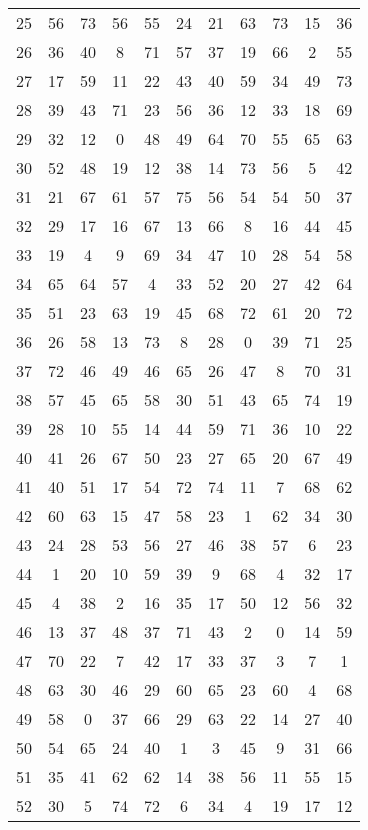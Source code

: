 \begin{table}
\begin{tabular}{c c c c c c c c c c c }
25 & 56 & 73 & 56 & 55 & 24 & 21 & 63 & 73 & 15 & 36 \\
26 & 36 & 40 & 8 & 71 & 57 & 37 & 19 & 66 & 2 & 55 \\
27 & 17 & 59 & 11 & 22 & 43 & 40 & 59 & 34 & 49 & 73 \\
28 & 39 & 43 & 71 & 23 & 56 & 36 & 12 & 33 & 18 & 69 \\
29 & 32 & 12 & 0 & 48 & 49 & 64 & 70 & 55 & 65 & 63 \\
30 & 52 & 48 & 19 & 12 & 38 & 14 & 73 & 56 & 5 & 42 \\
31 & 21 & 67 & 61 & 57 & 75 & 56 & 54 & 54 & 50 & 37 \\
32 & 29 & 17 & 16 & 67 & 13 & 66 & 8 & 16 & 44 & 45 \\
33 & 19 & 4 & 9 & 69 & 34 & 47 & 10 & 28 & 54 & 58 \\
34 & 65 & 64 & 57 & 4 & 33 & 52 & 20 & 27 & 42 & 64 \\
35 & 51 & 23 & 63 & 19 & 45 & 68 & 72 & 61 & 20 & 72 \\
36 & 26 & 58 & 13 & 73 & 8 & 28 & 0 & 39 & 71 & 25 \\
37 & 72 & 46 & 49 & 46 & 65 & 26 & 47 & 8 & 70 & 31 \\
38 & 57 & 45 & 65 & 58 & 30 & 51 & 43 & 65 & 74 & 19 \\
39 & 28 & 10 & 55 & 14 & 44 & 59 & 71 & 36 & 10 & 22 \\
40 & 41 & 26 & 67 & 50 & 23 & 27 & 65 & 20 & 67 & 49 \\
41 & 40 & 51 & 17 & 54 & 72 & 74 & 11 & 7 & 68 & 62 \\
42 & 60 & 63 & 15 & 47 & 58 & 23 & 1 & 62 & 34 & 30 \\
43 & 24 & 28 & 53 & 56 & 27 & 46 & 38 & 57 & 6 & 23 \\
44 & 1 & 20 & 10 & 59 & 39 & 9 & 68 & 4 & 32 & 17 \\
45 & 4 & 38 & 2 & 16 & 35 & 17 & 50 & 12 & 56 & 32 \\
46 & 13 & 37 & 48 & 37 & 71 & 43 & 2 & 0 & 14 & 59 \\
47 & 70 & 22 & 7 & 42 & 17 & 33 & 37 & 3 & 7 & 1 \\
48 & 63 & 30 & 46 & 29 & 60 & 65 & 23 & 60 & 4 & 68 \\
49 & 58 & 0 & 37 & 66 & 29 & 63 & 22 & 14 & 27 & 40 \\
50 & 54 & 65 & 24 & 40 & 1 & 3 & 45 & 9 & 31 & 66 \\
51 & 35 & 41 & 62 & 62 & 14 & 38 & 56 & 11 & 55 & 15 \\
52 & 30 & 5 & 74 & 72 & 6 & 34 & 4 & 19 & 17 & 12 \\

\end{tabular}
\end{table}
